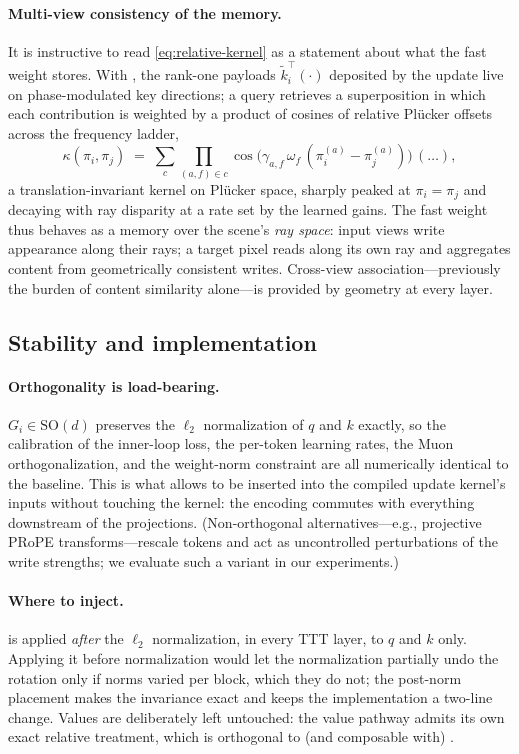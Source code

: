 \paragraph{Multi-view consistency of the memory.}
It is instructive to read \eqref{eq:relative-kernel} as a statement about
what the fast weight stores. With \ours{}, the rank-one payloads
$\tilde k_i^\top(\cdot)$ deposited by the update live on phase-modulated
key directions; a query retrieves a superposition in which each
contribution is weighted by a product of cosines of relative Plücker
offsets across the frequency ladder,
\begin{equation}
\label{eq:kernel-shape}
\kappa(\pi_i, \pi_j) \;=\; \textstyle\sum_{c} \prod_{(a,f) \in c}
\cos\!\big(\gamma_{a,f}\,\omega_f\,(\pi_i^{(a)} - \pi_j^{(a)})\big)\,(\dots),
\end{equation}
a translation-invariant kernel on Plücker space, sharply peaked at
$\pi_i = \pi_j$ and decaying with ray disparity at a rate set by the learned
gains. The fast weight thus behaves as a memory over the scene's
\emph{ray space}: input views write appearance along their rays; a target
pixel reads along its own ray and aggregates content from geometrically
consistent writes. Cross-view association---previously the burden of
content similarity alone---is provided by geometry at every layer.

\subsection{Stability and implementation}
\label{sec:method-impl}

\paragraph{Orthogonality is load-bearing.}
$G_i \in \mathrm{SO}(d)$ preserves the $\ell_2$ normalization of $q$ and
$k$ exactly, so the calibration of the inner-loop loss, the per-token
learning rates, the Muon orthogonalization, and the weight-norm constraint
are all numerically identical to the baseline. This is what allows \ours{}
to be inserted into the compiled update kernel's inputs without touching
the kernel: the encoding commutes with everything downstream of the
projections. (Non-orthogonal alternatives---e.g., projective PRoPE
transforms---rescale tokens and act as uncontrolled perturbations of the
write strengths; we evaluate such a variant in our experiments.)

\paragraph{Where to inject.}
\ours{} is applied \emph{after} the $\ell_2$ normalization, in every TTT
layer, to $q$ and $k$ only. Applying it before normalization would let the
normalization partially undo the rotation only if norms varied per block,
which they do not; the post-norm placement makes the invariance exact and
keeps the implementation a two-line change. Values are deliberately left
untouched: the value pathway admits its own exact relative treatment,
which is orthogonal to (and composable with) \ours{}.

